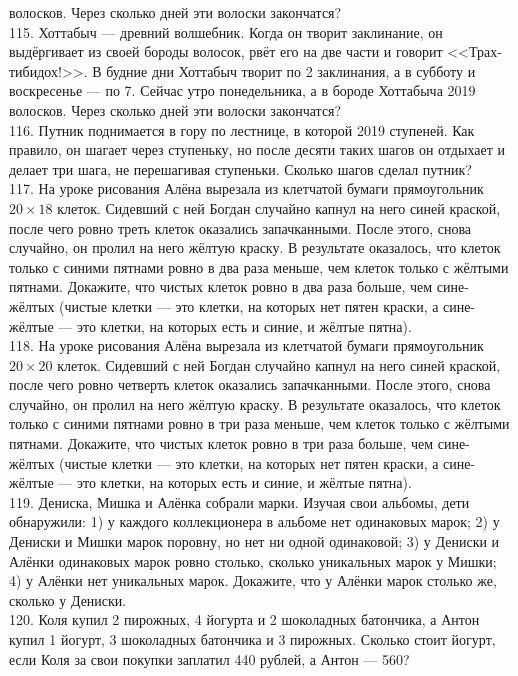 \documentclass[12pt]{article}
\begin{document}
волосков. Через сколько дней эти волоски закончатся?\\
115. Хоттабыч --- древний волшебник. Когда он творит заклинание, он выдёргивает из своей бороды волосок, рвёт его на две части и говорит <<Трах-тибидох!>>. В будние дни Хоттабыч творит по 2 заклинания, а в субботу и воскресенье --- по 7. Сейчас утро понедельника, а в бороде Хоттабыча 2019
волосков. Через сколько дней эти волоски закончатся?\\
116. Путник поднимается в гору по лестнице, в которой 2019 ступеней. Как правило, он шагает через ступеньку, но после десяти таких шагов он отдыхает и делает три шага, не перешагивая ступеньки. Сколько шагов сделал путник?\\
117. На уроке рисования Алёна вырезала из клетчатой бумаги прямоугольник $20\times18$ клеток. Сидевший с ней Богдан случайно капнул на него синей краской, после чего ровно треть клеток оказались запачканными. После этого, снова случайно, он пролил на него жёлтую краску. В результате оказалось, что клеток только с синими пятнами ровно в два раза меньше, чем клеток только с жёлтыми пятнами. Докажите, что чистых клеток ровно в два раза больше, чем сине-жёлтых (чистые клетки --- это клетки, на которых нет пятен краски, а сине-жёлтые --- это клетки, на которых есть и синие, и жёлтые пятна).\\
118.  На уроке рисования Алёна вырезала из клетчатой бумаги прямоугольник $20\times20$ клеток. Сидевший с ней Богдан случайно капнул на него синей краской, после чего ровно четверть клеток оказались запачканными. После этого, снова случайно, он пролил на него жёлтую краску. В результате оказалось, что клеток только с синими пятнами ровно в три раза меньше, чем клеток только с жёлтыми пятнами. Докажите, что чистых клеток ровно в три раза больше, чем сине-жёлтых (чистые клетки --- это клетки, на которых нет пятен краски, а сине-жёлтые --- это клетки, на которых есть и синие, и жёлтые пятна).\\
119. Дениска, Мишка и Алёнка собрали марки. Изучая свои альбомы, дети обнаружили: 1) у каждого коллекционера в альбоме нет одинаковых марок; 2) у Дениски и Мишки марок поровну, но нет ни одной одинаковой; 3) у Дениски и Алёнки одинаковых марок ровно столько, сколько уникальных марок у Мишки; 4) у Алёнки нет уникальных марок. Докажите, что у Алёнки марок столько же, сколько у Дениски.\\
120. Коля купил 2 пирожных, 4 йогурта и 2 шоколадных батончика, а Антон купил 1 йогурт, 3 шоколадных батончика и 3 пирожных. Сколько стоит йогурт, если Коля за свои покупки заплатил 440 рублей, а Антон --- 560?\\
\end{document}
